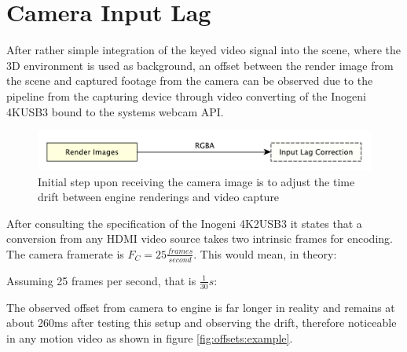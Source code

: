 %
\section{Camera Input Lag}

After rather simple integration of the keyed video signal into the scene, where 
the 3D environment is used as background, an offset between the render image 
from the scene and captured footage from the camera can be observed due to 
the pipeline from the capturing device through video converting of the Inogeni 
4KUSB3 bound to the systems webcam API.

\begin{figure}[htb]
	\includegraphics[width=\textwidth]{_raw_resources/pipeline_steps/4_2_swapper.pdf}
	\caption{Initial step upon receiving the camera image is to adjust the time 
	drift between engine renderings and video capture}
	\label{fig:steps:swapper}
\end{figure}

After consulting the specification of the Inogeni 4K2USB3 it states that a 
conversion from any HDMI video source takes two intrinsic frames for encoding. 
The camera framerate is $F_C = 25 \frac{frames}{second}$. This would mean, in 
theory:


Assuming 25 frames per second, that is $\frac{1}{30}s$:



The observed offset from camera to engine is far longer in reality and remains 
at about 260ms after testing this setup and observing the drift, therefore 
noticeable in any motion video as shown in figure \ref{fig:offsets:example}.

